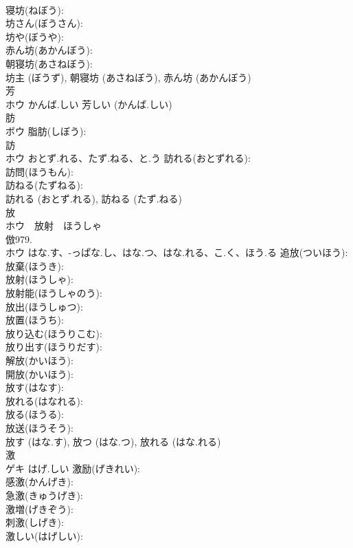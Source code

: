 \documentclass[8pt]{extreport}
\begin{document}
\begin{CJK}{UTF8}{min}
\\	寝坊(ねぼう): 
\\	坊さん(ぼうさん): 
\\	坊や(ぼうや): 
\\	赤ん坊(あかんぼう): 
\\	朝寝坊(あさねぼう): 
\\	坊主 (ぼうず), 朝寝坊 (あさねぼう), 赤ん坊 (あかんぼう)
\\	芳			
\\	ホウ	かんば.しい		芳しい (かんば.しい)
\\	肪			
\\	ボウ		脂肪(しぼう): 
\\	訪			
\\	ホウ	おとず.れる、たず.ねる、と.う	訪れる(おとずれる): 
\\	訪問(ほうもん): 
\\	訪ねる(たずねる): 
\\	訪れる (おとず.れる), 訪ねる (たず.ねる)
\\	放		
\\	ホウ　放射　ほうしゃ
\\	倣979.	
\\	ホウ	はな.す、-っぱな.し、はな.つ、はな.れる、こ.く、ほう.る	追放(ついほう): 
\\	放棄(ほうき): 
\\	放射(ほうしゃ): 
\\	放射能(ほうしゃのう): 
\\	放出(ほうしゅつ): 
\\	放置(ほうち): 
\\	放り込む(ほうりこむ): 
\\	放り出す(ほうりだす): 
\\	解放(かいほう): 
\\	開放(かいほう): 
\\	放す(はなす): 
\\	放れる(はなれる): 
\\	放る(ほうる): 
\\	放送(ほうそう): 
\\	放す (はな.す), 放つ (はな.つ), 放れる (はな.れる)
\\	激		
\\	ゲキ	はげ.しい	激励(げきれい): 
\\	感激(かんげき): 
\\	急激(きゅうげき): 
\\	激増(げきぞう): 
\\	刺激(しげき): 
\\	激しい(はげしい): 

\end{CJK}
\end{document}
